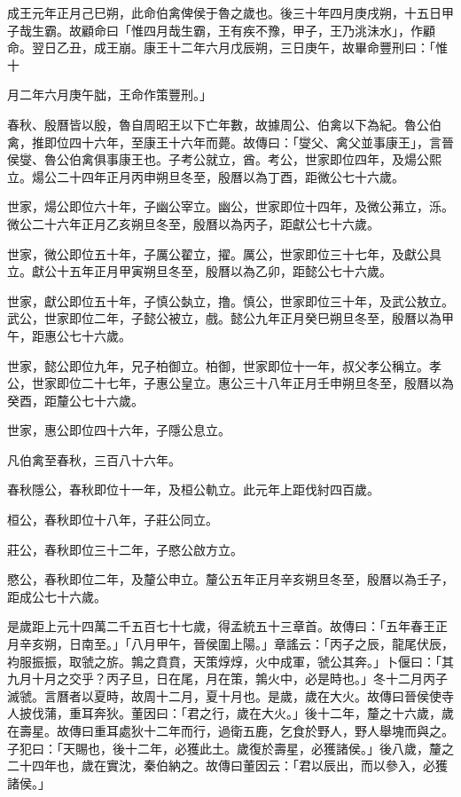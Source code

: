 \begin{pinyinscope}
成王元年正月己巳朔，此命伯禽俾侯于魯之歲也。後三十年四月庚戌朔，十五日甲子哉生霸。故顧命曰「惟四月哉生霸，王有疾不豫，甲子，王乃洮沬水」，作顧命。翌日乙丑，成王崩。康王十二年六月戊辰朔，三日庚午，故畢命豐刑曰：「惟十

月二年六月庚午朏，王命作策豐刑。」

春秋、殷曆皆以殷，魯自周昭王以下亡年數，故據周公、伯禽以下為紀。魯公伯禽，推即位四十六年，至康王十六年而薨。故傳曰：「燮父、禽父並事康王」，言晉侯燮、魯公伯禽俱事康王也。子考公就立，酋。考公，世家即位四年，及煬公熙立。煬公二十四年正月丙申朔旦冬至，殷曆以為丁酉，距微公七十六歲。

世家，煬公即位六十年，子幽公宰立。幽公，世家即位十四年，及微公茀立，泺。微公二十六年正月乙亥朔旦冬至，殷曆以為丙子，距獻公七十六歲。

世家，微公即位五十年，子厲公翟立，擢。厲公，世家即位三十七年，及獻公具立。獻公十五年正月甲寅朔旦冬至，殷曆以為乙卯，距懿公七十六歲。

世家，獻公即位五十年，子慎公埶立，撸。慎公，世家即位三十年，及武公敖立。武公，世家即位二年，子懿公被立，戲。懿公九年正月癸巳朔旦冬至，殷曆以為甲午，距惠公七十六歲。

世家，懿公即位九年，兄子柏御立。柏御，世家即位十一年，叔父孝公稱立。孝公，世家即位二十七年，子惠公皇立。惠公三十八年正月壬申朔旦冬至，殷曆以為癸酉，距釐公七十六歲。

世家，惠公即位四十六年，子隱公息立。

凡伯禽至春秋，三百八十六年。

春秋隱公，春秋即位十一年，及桓公軌立。此元年上距伐紂四百歲。

桓公，春秋即位十八年，子莊公同立。

莊公，春秋即位三十二年，子愍公啟方立。

愍公，春秋即位二年，及釐公申立。釐公五年正月辛亥朔旦冬至，殷曆以為壬子，距成公七十六歲。

是歲距上元十四萬二千五百七十七歲，得孟統五十三章首。故傳曰：「五年春王正月辛亥朔，日南至。」「八月甲午，晉侯圍上陽。」章謠云：「丙子之辰，龍尾伏辰，袀服振振，取虢之旂。鶉之賁賁，天策焞焞，火中成軍，虢公其奔。」卜偃曰：「其九月十月之交乎？丙子旦，日在尾，月在策，鶉火中，必是時也。」冬十二月丙子滅虢。言曆者以夏時，故周十二月，夏十月也。是歲，歲在大火。故傳曰晉侯使寺人披伐蒲，重耳奔狄。董因曰：「君之行，歲在大火。」後十二年，釐之十六歲，歲在壽星。故傳曰重耳處狄十二年而行，過衛五鹿，乞食於野人，野人舉塊而與之。子犯曰：「天賜也，後十二年，必獲此土。歲復於壽星，必獲諸侯。」後八歲，釐之二十四年也，歲在實沈，秦伯納之。故傳曰董因云：「君以辰出，而以參入，必獲諸侯。」


\end{pinyinscope}
